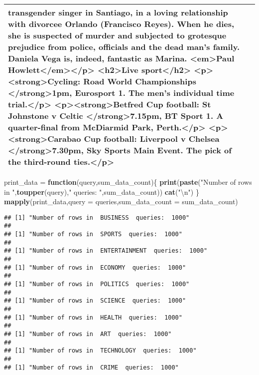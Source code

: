 \documentclass[]{article}
\newenvironment{Shaded}{\begin{snugshade}}{\end{snugshade}}
\newcommand{\KeywordTok}[1]{\textcolor[rgb]{0.13,0.29,0.53}{\textbf{#1}}}
\newcommand{\DataTypeTok}[1]{\textcolor[rgb]{0.13,0.29,0.53}{#1}}
\newcommand{\CharTok}[1]{\textcolor[rgb]{0.31,0.60,0.02}{#1}}
\newcommand{\StringTok}[1]{\textcolor[rgb]{0.31,0.60,0.02}{#1}}
\newcommand{\ControlFlowTok}[1]{\textcolor[rgb]{0.13,0.29,0.53}{\textbf{#1}}}
\newcommand{\NormalTok}[1]{#1}
\begin{document}
\begin{table}[!h]
{\begin{tabular}[t]{ll}
transgender singer in Santiago, in a loving relationship with divorcee Orlando (Francisco Reyes). When he dies, she is suspected of murder and subjected to grotesque prejudice from police, officials and the dead man’s family. Daniela Vega is, indeed, fantastic as Marina. <em>Paul Howlett</em></p> <h2>Live sport</h2> <p><strong>Cycling: Road World Championships </strong>1pm, Eurosport 1. The men’s individual time trial.</p> <p><strong>Betfred Cup football: St Johnstone v Celtic </strong>7.15pm, BT Sport 1. A quarter-final from McDiarmid Park, Perth.</p> <p><strong>Carabao Cup football: Liverpool v Chelsea </strong>7.30pm, Sky Sports Main Event. The pick of the third-round ties.</p>\\
\bottomrule
\end{tabular}}
\end{table}


\newpage

\newpage

\begin{Shaded}
\begin{Highlighting}[]
\NormalTok{print_data =}\StringTok{ }\ControlFlowTok{function}\NormalTok{(query,sum_data_count)\{}
  \KeywordTok{print}\NormalTok{(}\KeywordTok{paste}\NormalTok{(}\StringTok{"Number of rows in "}\NormalTok{,}\KeywordTok{toupper}\NormalTok{(query),}\StringTok{" queries: "}\NormalTok{,sum_data_count))}
  \KeywordTok{cat}\NormalTok{(}\StringTok{"}\CharTok{\textbackslash{}n}\StringTok{"}\NormalTok{)}
\NormalTok{\}}
\KeywordTok{mapply}\NormalTok{(print_data,}\DataTypeTok{query =}\NormalTok{ queries,}\DataTypeTok{sum_data_count =}\NormalTok{ sum_data_count)}
\end{Highlighting}
\end{Shaded}

\begin{verbatim}
## [1] "Number of rows in  BUSINESS  queries:  1000"
## 
## [1] "Number of rows in  SPORTS  queries:  1000"
## 
## [1] "Number of rows in  ENTERTAINMENT  queries:  1000"
## 
## [1] "Number of rows in  ECONOMY  queries:  1000"
## 
## [1] "Number of rows in  POLITICS  queries:  1000"
## 
## [1] "Number of rows in  SCIENCE  queries:  1000"
## 
## [1] "Number of rows in  HEALTH  queries:  1000"
## 
## [1] "Number of rows in  ART  queries:  1000"
## 
## [1] "Number of rows in  TECHNOLOGY  queries:  1000"
## 
## [1] "Number of rows in  CRIME  queries:  1000"
\end{verbatim}
\end{document}
